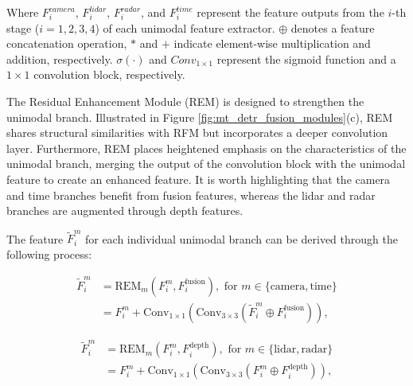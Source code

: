 \documentclass[report.tex]{subfiles}
\begin{document}
    Where $F_{i}^{camera}$, $F_{i}^{lidar}$, $F_{i}^{radar}$, and $F_{i}^{time}$ represent the feature outputs from the $i$-th stage ($i = 1,2,3,4$) of each unimodal feature extractor. $\oplus$ denotes a feature concatenation operation, $*$ and $+$ indicate element-wise multiplication and addition, respectively. $\sigma(\cdot)$ and ${Conv}_{1\times1}$ represent the sigmoid function and a $1 \times 1$ convolution block, respectively.

    

    The Residual Enhancement Module (REM) is designed to strengthen the unimodal branch. Illustrated in Figure \ref{fig:mt_detr_fusion_modules}(c), REM shares structural similarities with RFM but incorporates a deeper convolution layer. Furthermore, REM places heightened emphasis on the characteristics of the unimodal branch, merging the output of the convolution block with the unimodal feature to create an enhanced feature. It is worth highlighting that the camera and time branches benefit from fusion features, whereas the lidar and radar branches are augmented through depth features.

    The feature \(\tilde{F}_{i}^{m}\) for each individual unimodal branch can be derived through the following process:

    \begin{equation}
        \begin{split}
            \tilde{F}_{i}^{m} &= \text{REM}_{m} (F_{i}^{m}, F_{i}^{\text{fusion}}), \text{ for } m \in \{\text{camera}, \text{time}\} \\
            &= F_{i}^{m} + \text{Conv}_{1\times1}(\text{Conv}_{3\times3}(\tilde{F}_{i}^{m} \oplus F_{i}^{\text{fusion}})),
        \end{split}
    \end{equation}
    
    \begin{equation}
        \begin{split}
            \tilde{F}_{i}^{m} &= \text{REM}_{m} (F_{i}^{m}, F_{i}^{\text{depth}}), \text{ for } m \in \{\text{lidar}, \text{radar}\} \\
            &= F_{i}^{m} + \text{Conv}_{1\times1}(\text{Conv}_{3\times3}(F_{i}^{m} \oplus F_{i}^{\text{depth}})),
        \end{split}
    \end{equation}  
\end{document}
